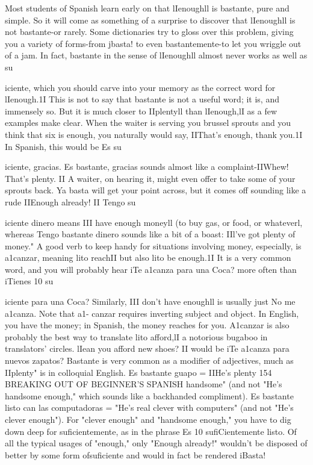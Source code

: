 Most students of Spanish learn early on that lIenoughll is bastante, pure and simple. So it will come as something of a surprise to
discover that lIenoughll is not bastante-or rarely. Some dictionaries
try to gloss over this problem, giving you a variety of forms-from
jbasta! to even bastantemente-to let you wriggle out of a jam. In
fact, bastante in the sense of lIenoughll almost never works as well as
su{iciente, which you should carve into your memory as the correct
word for lIenough.1I
This is not to say that bastante is not a useful word; it is,
and immensely so. But it is much closer to IIplentyll than lIenough,lI
as a few examples make clear. When the waiter is serving you brussel sprouts and you think that six is enough, you naturally would say,
IIThat's enough, thank you.1I In Spanish, this would be Es su{iciente,
gracias. Es bastante, gracias sounds almost like a complaint-IIWhew!
That's plenty. II A waiter, on hearing it, might even offer to take some
of your sprouts back. Ya basta will get your point across, but it comes
off sounding like a rude IIEnough already! II Tengo su{iciente dinero
means III have enough moneyll (to buy gas, or food, or whateverl,
whereas Tengo bastante dinero sounds like a bit of a boast: IIl've got
plenty of money."
A good verb to keep handy for situations involving money, especially, is a1canzar, meaning lito reachII but also lito be enough.1I It is
a very common word, and you will probably hear iTe a1canza para una
Coca? more often than iTienes 10 su{iciente para una Coca? Similarly,
III don't have enoughll is usually just No me a1canza. Note that a1-
canzar requires inverting subject and object. In English, you have the
money; in Spanish, the money reaches for you. A1canzar is also probably the best way to translate lito afford,lI a notorious bugaboo in translators' circles. lIean you afford new shoes? II would be iTe a1canza para
nuevos zapatos?
Bastante is very common as a modifier of adjectives, much as
IIplenty" is in colloquial English. Es bastante guapo = IIHe's plenty
154 BREAKING OUT OF BEGINNER'S SPANISH
handsome" (and not "He's handsome enough," which sounds like a
backhanded compliment). Es bastante listo can las computadoras =
"He's real clever with computers" (and not "He's clever enough"). For
"clever enough" and "handsome enough," you have to dig down deep
for suficientemente, as in the phrase Es 10 sufiCientemente listo.
Of all the typical usages of "enough," only "Enough already!"
wouldn't be disposed of better by some form ofsuficiente and would in
fact be rendered iBasta!

}}}}
